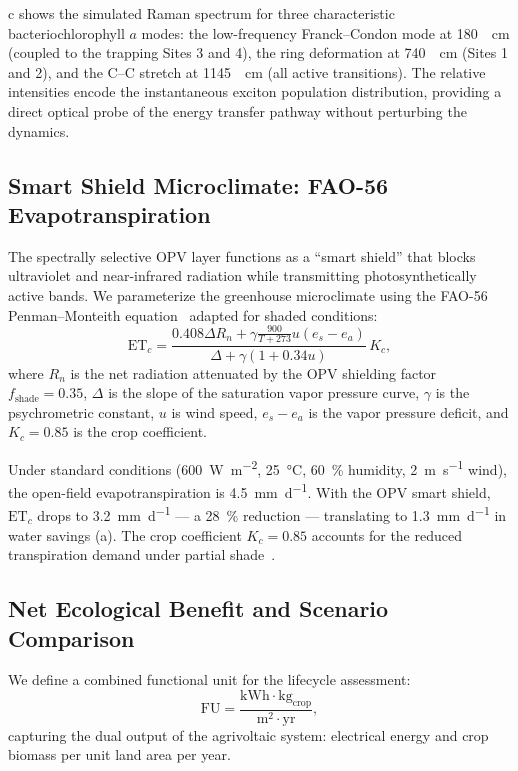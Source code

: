 \documentclass[twocolumn]{article}
\begin{document}
c shows the simulated Raman spectrum for three characteristic bacteriochlorophyll $a$ modes:
the low-frequency Franck--Condon mode at \SI{180}{\per\cm} (coupled to the trapping Sites 3 and 4), the ring deformation at \SI{740}{\per\cm} (Sites 1 and 2), and the C--C stretch at \SI{1145}{\per\cm} (all active transitions).
The relative intensities encode the instantaneous exciton population distribution, providing a direct optical probe of the energy transfer pathway without perturbing the dynamics.

\subsection*{Smart Shield Microclimate: FAO-56 Evapotranspiration}

The spectrally selective OPV layer functions as a ``smart shield'' that blocks ultraviolet and near-infrared radiation while transmitting photosynthetically active bands.
We parameterize the greenhouse microclimate using the FAO-56 Penman--Monteith equation~\cite{Allen1998} adapted for shaded conditions:
\begin{equation}
\mathrm{ET}_c = \frac{0.408 \Delta R_n + \gamma \frac{900}{T+273} u (e_s - e_a)}{\Delta + \gamma(1 + 0.34 u)} \, K_c,
\label{eq:fao56}
\end{equation}
where $R_n$ is the net radiation attenuated by the OPV shielding factor $f_{\mathrm{shade}} = 0.35$, $\Delta$ is the slope of the saturation vapor pressure curve, $\gamma$ is the psychrometric constant, $u$ is wind speed, $e_s - e_a$ is the vapor pressure deficit, and $K_c = 0.85$ is the crop coefficient.

Under standard conditions (\SI{600}{\W\per\m\squared}, \SI{25}{\celsius}, \SI{60}{\percent} humidity, \SI{2}{\m\per\s} wind), the open-field evapotranspiration is \SI{4.5}{\mm\per\day}.
With the OPV smart shield, $\mathrm{ET}_c$ drops to \SI{3.2}{\mm\per\day} --- a \SI{28}{\percent} reduction --- translating to \SI{1.3}{\mm\per\day} in water savings (a).
The crop coefficient $K_c = 0.85$ accounts for the reduced transpiration demand under partial shade~\cite{Allen1998}.

\subsection*{Net Ecological Benefit and Scenario Comparison}

We define a combined functional unit for the lifecycle assessment:
\begin{equation}
\mathrm{FU} = \frac{\mathrm{kWh} \cdot \mathrm{kg}_{\mathrm{crop}}}{\mathrm{m}^2 \cdot \mathrm{yr}},
\label{eq:functional_unit}
\end{equation}
capturing the dual output of the agrivoltaic system: electrical energy and crop biomass per unit land area per year.
\end{document}
